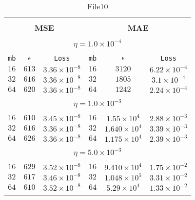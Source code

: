 \documentclass[10pt]{article}
\begin{document}
\begin{table}[]
  \small
  \caption{File10}\label{tab:tab1}
\begin{center}
\begin{tabular}{@{}ccc|ccc@{}}

\hline\\[-11pt]
\hline\\[-6.5pt]
\multicolumn{3}{c}{\bf MSE} & \multicolumn{3}{c}{\bf MAE } \\[5pt]
\hline\\[-11pt]
\multicolumn{6}{c}{$\eta = 1.0\times 10^{-4}$} \\[5pt]
\hline\\[-11pt]
\texttt{mb} & \texttt{$\epsilon$} & \texttt{Loss} & \texttt{mb} & \texttt{$\epsilon$} & \texttt{Loss} \\[1pt]
$16$ & $613$ & $3.36\times 10^{-8}$  &  $16$ & $3120$ & $6.22\times 10^{-4}$    \\ [1pt]
$32$ & $616$ & $3.36\times 10^{-8}$  &  $32$ & $1805$ & $3.1\times 10^{-4}$     \\ [1pt]
$64$ & $620$ & $3.36\times 10^{-8}$  &  $64$ & $1242$ & $2.24\times 10^{-4}$    \\ [1pt]

\hline\\[-11pt]
\multicolumn{6}{c}{$\eta = 1.0\times 10^{-3}$} \\[5pt]
\hline\\[-11pt]
$16$ & $610$ & $3.45\times 10^{-8}$  &  $16$ & $1.55\times 10^{4}$ & $2.88\times 10^{-3}$   \\ [1pt]
$32$ & $616$ & $3.36\times 10^{-8}$  &  $32$ & $1.640\times 10^{4}$ & $3.39\times 10^{-3}$   \\ [1pt]
$64$ & $626$ & $3.36\times 10^{-8}$  &  $64$ & $1.175\times 10^{4}$ & $2.39\times 10^{-3}$   \\ [1pt]
\hline\\[-11pt]
\multicolumn{6}{c}{$\eta = 5.0\times 10^{-3}$} \\[5pt]
\hline\\[-11pt]
$16$ & $629$ & $3.52\times 10^{-8}$  &  $16$ & $9.410\times 10^{4}$ & $1.75\times 10^{-2}$   \\ [1pt]
$32$ & $617$ & $3.46\times 10^{-8}$  &  $32$ & $1.048\times 10^{5}$ & $3.31\times 10^{-2}$  \\ [1pt]
$64$ & $610$ & $3.52\times 10^{-8}$  &  $64$ & $5.29\times 10^{4}$ & $1.33\times 10^{-2}$   \\ [1pt]
\hline\\[-11pt]


\end{tabular}
\end{center}
\end{table}
\end{document}
